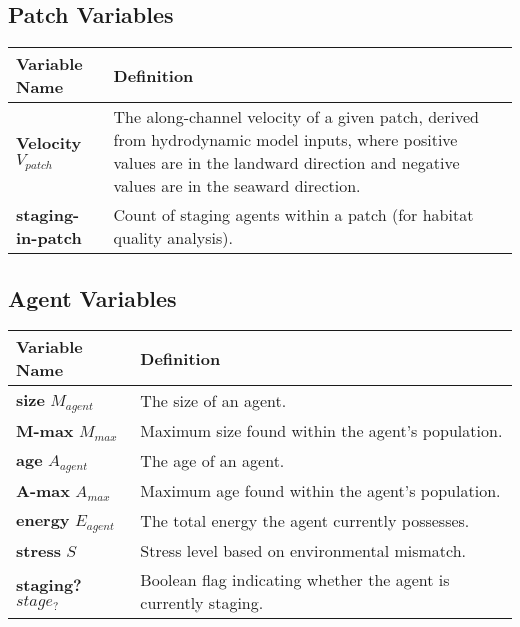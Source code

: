 \documentclass[
]{book}
\begin{document}
\subsection{Patch Variables}\label{patch-variables-6}

\begin{longtable}[]{@{}
  >{\centering\arraybackslash}p{}
  >{\centering\arraybackslash}p{}@{}}
\toprule\noalign{}
\begin{minipage}[b]{\linewidth}\centering
Variable Name
\end{minipage} & \begin{minipage}[b]{\linewidth}\centering
Definition
\end{minipage} \\
\midrule\noalign{}
\endhead
\bottomrule\noalign{}
\endlastfoot
\textbf{Velocity} \(V_{patch}\) & The along-channel velocity of a given patch, derived from hydrodynamic model inputs, where positive values are in the landward direction and negative values are in the seaward direction. \\
\textbf{staging-in-patch} & Count of staging agents within a patch (for habitat quality analysis). \\
\end{longtable}

\subsection{Agent Variables}\label{agent-variables-6}

\begin{longtable}[]{@{}
  >{\centering\arraybackslash}p{}
  >{\centering\arraybackslash}p{}@{}}
\toprule\noalign{}
\begin{minipage}[b]{\linewidth}\centering
Variable Name
\end{minipage} & \begin{minipage}[b]{\linewidth}\centering
Definition
\end{minipage} \\
\midrule\noalign{}
\endhead
\bottomrule\noalign{}
\endlastfoot
\textbf{size} \(M_{agent}\) & The size of an agent. \\
\textbf{M-max} \(M_{max}\) & Maximum size found within the agent's population. \\
\textbf{age} \(A_{agent}\) & The age of an agent. \\
\textbf{A-max} \(A_{max}\) & Maximum age found within the agent's population. \\
\textbf{energy} \(E_{agent}\) & The total energy the agent currently possesses. \\
\textbf{stress} \(S\) & Stress level based on environmental mismatch. \\
\textbf{staging?} \(stage_{?}\) & Boolean flag indicating whether the agent is currently staging. \\
\end{longtable}
\end{document}
